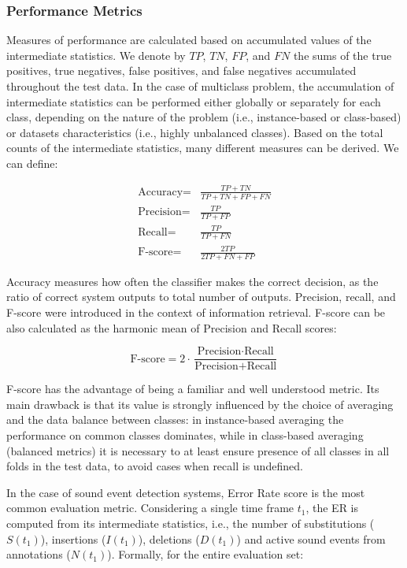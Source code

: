 \subsubsection{Performance Metrics}
Measures of performance are calculated based on accumulated values of the intermediate statistics. 
We denote by $TP$, $TN$, $FP$, and $FN$ the sums of the true positives, true negatives, false positives, and false negatives accumulated throughout the test data. In the case of multiclass problem, the accumulation of intermediate statistics can be performed either globally or separately for each class, depending on the nature of the problem (i.e., instance-based or class-based) or datasets characteristics (i.e., highly unbalanced classes).
Based on the total counts of the intermediate statistics, many different measures can be derived.  We can define:

\begin{eqnarray}
\text{Accuracy} =& \frac{TP+TN}{TP+TN+FP+FN} \\
\text{Precision} =& \frac{TP}{TP+FP} \\
\text{Recall} =& \frac{TP}{TP+FN}  \\
\text{F-score} =& \frac{2TP}{2TP+FN+FP}  
\end{eqnarray}

Accuracy measures how often the classifier makes the correct decision,
 as the ratio of correct system outputs to total number of outputs. Precision, recall, and F-score were introduced in the context of information retrieval. F-score can be also calculated as the harmonic mean of Precision and Recall scores:

\begin{equation}
 \text{F-score} = 2 \cdot \frac{\text{Precision}\cdot\text{Recall}}{\text{Precision}+\text{Recall}}
\end{equation}

F-score has the advantage of being a familiar and well understood metric. Its main drawback is that its value is strongly influenced by the choice of averaging and the data balance between classes: in instance-based averaging the performance
on common classes dominates, while in class-based averaging (balanced metrics) it is necessary to at least ensure presence of all classes in all folds in the test data, to avoid cases when recall is undefined.

In the case of sound event detection systems, Error Rate score is the most common evaluation metric. Considering a single time frame  $t_1$, the ER is computed from its intermediate statistics, i.e., the number of substitutions ($S(t_1)$), insertions ($I(t_1)$), deletions ($D(t_1)$) and active sound events from annotations ($N(t_1)$). Formally, for the entire evaluation set:

